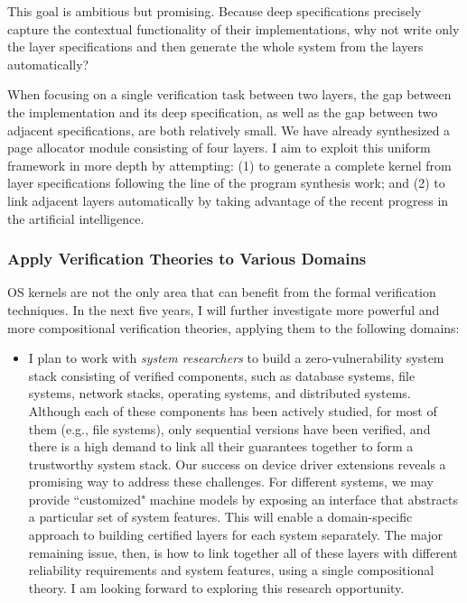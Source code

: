 \documentclass[a4paper, 10pt]{article}
\begin{document}
\begin{small}
This goal is ambitious but promising.
Because deep specifications
precisely capture the contextual functionality of their implementations, why not write only the layer specifications
and then generate the whole system from the layers automatically?
\begin{comment}
I plan to extend the CertiKOS
framework such that the layer specification can be smartly 
``compiled" into C programs that meet the specification
and the layers at different abstract level can be linked together in a mostly automated way.
\end{comment}
When focusing on a single verification task between two layers,
 the gap between the implementation and its deep specification, as  well as the gap between two adjacent specifications,
are both relatively small.  We have already synthesized
a page allocator module consisting of four layers. 
I aim to  exploit this uniform framework in more depth by attempting: (1) to generate a complete kernel
 from layer specifications
following the line of the program synthesis work;
and (2) to link adjacent layers automatically
by taking advantage of the recent progress in the
artificial intelligence.

\subsubsection*{\small Apply Verification Theories to Various Domains}
OS kernels are not the only area that can benefit
from the formal verification techniques. In the next five years, I will further investigate more powerful and more compositional  verification theories,
applying them
to the following domains: 
\begin{itemize}
\item I plan to work with \emph{system researchers} to build a zero-vulnerability system stack consisting of verified components, such as 
database systems, file systems, network stacks, operating systems,
 and distributed systems.
 Although each of these components has been actively studied,
 for most of them  (e.g., file systems), only  sequential versions have been verified, and there is a high demand to 
link all their guarantees together
to form  a  trustworthy system stack. Our success on  device driver extensions
reveals a promising way to address these challenges.
For different systems, we may
provide ``customized" machine models
by exposing an  interface that abstracts  a particular set of system features.
This will enable a domain-specific approach to building certified layers for each system separately.
The major remaining issue, then, is how to link together all of these layers with different reliability requirements
and  system features, using a single compositional theory.
I am looking forward to exploring this research opportunity.



\end{itemize}
\end{small}
\end{document}
